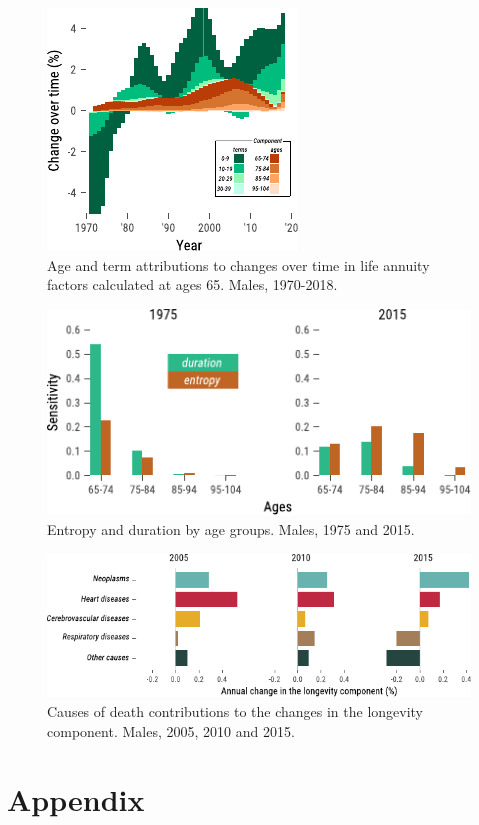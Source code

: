 \documentclass[12pt]{article}
\begin{document}
\begin{figure}[!ht]
	\centering
	\includegraphics[width=0.4\linewidth]{Fig/DescAge}
	\caption{{Age and term attributions to changes over time in life annuity factors calculated at ages 65. Males, 1970-2018.}}
	\label{fig:Fig5}
\end{figure}


\begin{figure}[!ht]
	\centering
	\includegraphics[width=0.7\linewidth]{Fig/AttributionDH}
	\caption{{Entropy and duration by age groups. Males, 1975 and 2015.}}
	\label{fig:Fig6}
\end{figure}

\begin{figure}[!ht]
	\centering
	\includegraphics[width=1\linewidth]{Fig/DescCod}
	\caption{{Causes of death contributions to the changes in the longevity component. Males, 2005, 2010 and 2015.}}
	\label{fig:Fig7}
\end{figure}


\FloatBarrier
\newpage
\appendix
\section{Appendix}
\end{document}
